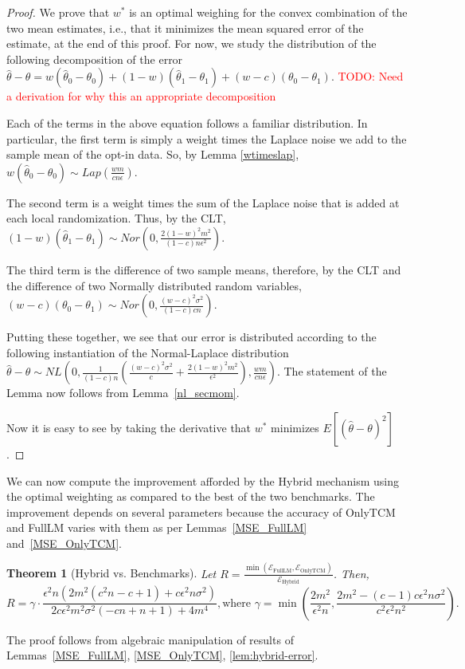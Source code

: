 \documentclass{article}
\newcommand\TODO[1]{\textcolor{red}{TODO: {#1}}}
\theoremstyle{plain}
\newtheorem{thm}{Theorem}[section]
\begin{document}
\begin{proof}
We prove that $w^*$ is an optimal weighing for the convex combination of the two mean estimates, i.e., that it minimizes the mean squared error of the estimate, at the end of this proof. For now, we study the distribution of the following decomposition of the error
$\hat{\theta} - \theta = w(\hat{\theta}_0 - \theta_0) + (1-w)(\hat{\theta}_1 - \theta_1) + (w-c)(\theta_0 - \theta_1).$ \TODO{Need a derivation for why this an appropriate decomposition}

Each of the terms in the above equation follows a familiar distribution. In particular, the first term is simply a weight times the Laplace noise we add to the sample mean of the opt-in data. So, by Lemma \ref{wtimeslap},
$w(\hat{\theta}_0 - \theta_0) \sim Lap\left(\frac{wm}{cn\epsilon}\right).$

The second term is a weight times the sum of the Laplace noise that is added at each local randomization. Thus, by the CLT,
$(1-w)(\hat{\theta}_1 - \theta_1) \sim Nor\left(0, \frac{2(1-w)^2 m^2}{(1-c)n\epsilon^2}\right).$

The third term is the difference of two sample means, therefore, by the CLT and the difference of two Normally distributed random variables, 
$(w-c)(\theta_0 - \theta_1) \sim Nor\left(0, \frac{(w-c)^2\sigma^2}{(1-c)cn}\right).$

Putting these together, we see that our error is distributed according to the following instantiation of the Normal-Laplace distribution
$\hat{\theta} - \theta \sim NL\left(0, \frac{1}{(1-c)n}\left(\frac{(w-c)^2\sigma^2}{c} + \frac{2(1-w)^2 m^2}{\epsilon^2}\right), \frac{wm}{cn\epsilon}\right).$ The statement of the Lemma now follows from Lemma~\ref{nl_secmom}.

Now it is easy to see by taking the derivative that $w^*$ minimizes $E[(\hat{\theta} - \theta)^2]$.
\end{proof}

We can now compute the improvement afforded by the Hybrid mechanism using the optimal weighting as compared to the best of the two benchmarks. The improvement depends on several parameters because the accuracy of OnlyTCM and FullLM varies with them as per Lemmas~\ref{MSE_FullLM} and~\ref{MSE_OnlyTCM}. 

\begin{thm}[Hybrid vs. Benchmarks]\label{thm:main}
Let $R = \frac{\min(\mathcal{E}_{\text{FullLM}}, \mathcal{E}_{\text{OnlyTCM}})}{\mathcal{E}_{\text{Hybrid}}}$.
Then, 
$$R = \gamma \cdot \frac{\epsilon^2 n \left(2 m^2 \left(c^2 n-c+1\right)+c \epsilon^2 n \sigma^2\right)}{2 c \epsilon^2 m^2 \sigma^2 (-c n+n+1)+4 m^4}, \text{where } \gamma = \min \left(\frac{2 m^2}{\epsilon^2 n},\frac{2 m^2-(c-1) c \epsilon^2 n \sigma^2}{c^2 \epsilon^2 n^2}\right).$$
\end{thm}
The proof follows from algebraic manipulation of results of Lemmas~\ref{MSE_FullLM}, \ref{MSE_OnlyTCM}, \ref{lem:hybrid-error}.
\end{document}
